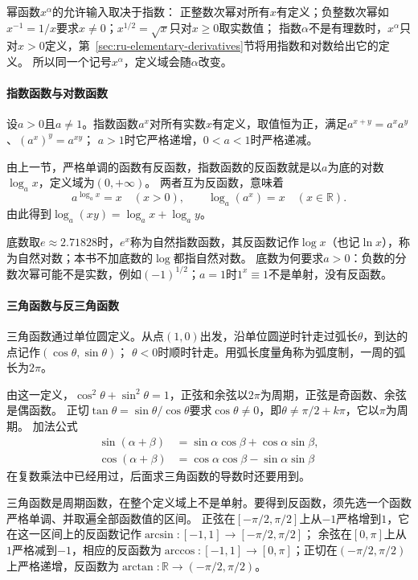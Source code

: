 幂函数$x^\alpha$的允许输入取决于指数：
正整数次幂对所有$x$有定义；负整数次幂如$x^{-1}=1/x$要求$x\neq0$；$x^{1/2}=\sqrt x$只对$x\geq0$取实数值；
指数$\alpha$不是有理数时，$x^\alpha$只对$x>0$定义，第~\ref{sec:ru-elementary-derivatives}节将用指数和对数给出它的定义。
所以同一个记号$x^\alpha$，定义域会随$\alpha$改变。

\paragraph{指数函数与对数函数}
设$a>0$且$a\neq1$。指数函数$a^x$对所有实数$x$有定义，取值恒为正，满足$a^{x+y}=a^xa^y$、$(a^x)^y=a^{xy}$；
$a>1$时它严格递增，$0<a<1$时严格递减。

由上一节，严格单调的函数有反函数，指数函数的反函数就是以$a$为底的对数$\log_ax$，定义域为$(0,+\infty)$。
两者互为反函数，意味着
\[
 a^{\log_ax}=x\quad(x>0),\qquad \log_a(a^x)=x\quad(x\in\mathbb R).
\]
由此得到$\log_a(xy)=\log_ax+\log_ay$。

底数取$e\approx2.71828$时，$e^x$称为自然指数函数，其反函数记作$\log x$（也记$\ln x$），称为自然对数；本书不加底数的$\log$都指自然对数。
底数为何要求$a>0$：负数的分数次幂可能不是实数，例如$(-1)^{1/2}$；$a=1$时$1^x\equiv1$不是单射，没有反函数。

\paragraph{三角函数与反三角函数}
三角函数通过单位圆定义。从点$(1,0)$出发，沿单位圆逆时针走过弧长$\theta$，到达的点记作$(\cos\theta,\sin\theta)$；
$\theta<0$时顺时针走。用弧长度量角称为弧度制，一周的弧长为$2\pi$。

由这一定义，$\cos^2\theta+\sin^2\theta=1$，正弦和余弦以$2\pi$为周期，正弦是奇函数、余弦是偶函数。
正切$\tan\theta=\sin\theta/\cos\theta$要求$\cos\theta\neq0$，即$\theta\neq\pi/2+k\pi$，它以$\pi$为周期。
加法公式
\[
 \begin{aligned}
 \sin(\alpha+\beta)&=\sin\alpha\cos\beta+\cos\alpha\sin\beta,\\
 \cos(\alpha+\beta)&=\cos\alpha\cos\beta-\sin\alpha\sin\beta
 \end{aligned}
\]
在复数乘法中已经用过，后面求三角函数的导数时还要用到。

三角函数是周期函数，在整个定义域上不是单射。要得到反函数，须先选一个函数严格单调、并取遍全部函数值的区间。
正弦在$[-\pi/2,\pi/2]$上从$-1$严格增到$1$，它在这一区间上的反函数记作$\arcsin:[-1,1]\to[-\pi/2,\pi/2]$；
余弦在$[0,\pi]$上从$1$严格减到$-1$，相应的反函数为$\arccos:[-1,1]\to[0,\pi]$；正切在$(-\pi/2,\pi/2)$上严格递增，反函数为$\arctan:\mathbb R\to(-\pi/2,\pi/2)$。

